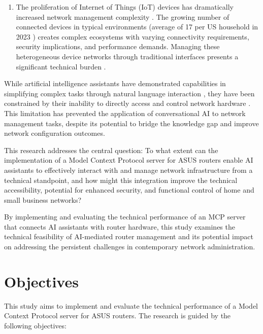\begin{enumerate}
\item The proliferation of Internet of Things (IoT) devices has dramatically increased network management complexity \cite{iot_device_management}. The growing number of connected devices in typical environments (average of 17 per US household in 2023 \cite{parks_associates}) creates complex ecosystems with varying connectivity requirements, security implications, and performance demands. Managing these heterogeneous device networks through traditional interfaces presents a significant technical burden \cite{iot_device_management}.
\end{enumerate}

While artificial intelligence assistants have demonstrated capabilities in simplifying complex tasks through natural language interaction \cite{llm_explainability}, they have been constrained by their inability to directly access and control network hardware \cite{irtf_ai_challenges}. This limitation has prevented the application of conversational AI to network management tasks, despite its potential to bridge the knowledge gap and improve network configuration outcomes.

This research addresses the central question: To what extent can the implementation of a Model Context Protocol server for ASUS routers enable AI assistants to effectively interact with and manage network infrastructure from a technical standpoint, and how might this integration improve the technical accessibility, potential for enhanced security, and functional control of home and small business networks?

By implementing and evaluating the technical performance of an MCP server that connects AI assistants with router hardware, this study examines the technical feasibility of AI-mediated router management and its potential impact on addressing the persistent challenges in contemporary network administration.

\section{Objectives}
This study aims to implement and evaluate the technical performance of a Model Context Protocol server for ASUS routers. The research is guided by the following objectives:

